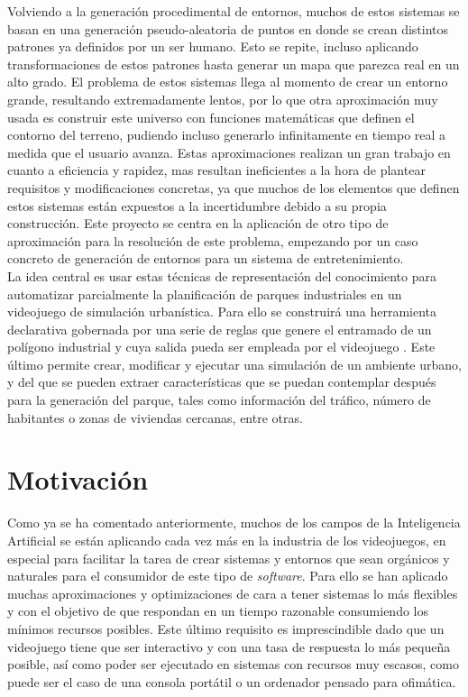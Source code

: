 Volviendo a la generación procedimental de entornos, muchos de estos sistemas se basan en una generación pseudo-aleatoria de puntos en donde se crean distintos patrones ya definidos por un ser humano. Esto se repite, incluso aplicando transformaciones de estos patrones hasta generar un mapa que parezca real en un alto grado. El problema de estos sistemas llega al momento de crear un entorno grande, resultando extremadamente lentos, por lo que otra aproximación muy usada es construir este universo con funciones matemáticas que definen el contorno del terreno, pudiendo incluso generarlo infinitamente en tiempo real a medida que el usuario avanza. Estas aproximaciones realizan un gran trabajo en cuanto a eficiencia y rapidez, mas resultan ineficientes a la hora de plantear requisitos y modificaciones concretas, ya que muchos de los elementos que definen estos sistemas están expuestos a la incertidumbre debido a su propia construcción. Este proyecto se centra en la aplicación de otro tipo de aproximación para la resolución de este problema, empezando por un caso concreto de generación de entornos para un sistema de entretenimiento. \\

La idea central es usar estas técnicas de representación del conocimiento para automatizar parcialmente la planificación de parques industriales en un videojuego de simulación urbanística. Para ello se construirá una herramienta declarativa gobernada por una serie de reglas que genere el entramado de un polígono industrial y cuya salida pueda ser empleada por el videojuego \cities. Este último permite crear, modificar y ejecutar una simulación de un ambiente urbano, y del que se pueden extraer características que se puedan contemplar después para la generación del parque, tales como información del tráfico, número de habitantes o zonas de viviendas cercanas, entre otras.

\section{Motivación}

Como ya se ha comentado anteriormente, muchos de los campos de la Inteligencia Artificial se están aplicando cada vez más en la industria de los videojuegos, en especial para facilitar la tarea de crear sistemas y entornos que sean orgánicos y naturales para el consumidor de este tipo de \textit{software}. Para ello se han aplicado muchas aproximaciones y optimizaciones de cara a tener sistemas lo más flexibles y con el objetivo de que respondan en un tiempo razonable consumiendo los mínimos recursos posibles. Este último requisito es imprescindible dado que un videojuego tiene que ser interactivo y con una tasa de respuesta lo más pequeña posible, así como poder ser ejecutado en sistemas con recursos muy escasos, como puede ser el caso de una consola portátil o un ordenador pensado para ofimática. \\

